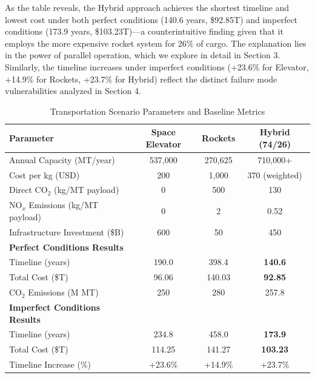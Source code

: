 \documentclass[12pt]{article}
\begin{document}
	As the table reveals, the Hybrid approach achieves the shortest timeline and lowest cost under both perfect conditions (140.6 years, \$92.85T) and imperfect conditions (173.9 years, \$103.23T)---a counterintuitive finding given that it employs the more expensive rocket system for 26\% of cargo. The explanation lies in the power of parallel operation, which we explore in detail in Section 3. Similarly, the timeline increases under imperfect conditions (+23.6\% for Elevator, +14.9\% for Rockets, +23.7\% for Hybrid) reflect the distinct failure mode vulnerabilities analyzed in Section 4.
	\begin{table}[H]
		\centering
		\caption{Transportation Scenario Parameters and Baseline Metrics}
		\label{tab:parameters}
		\begin{tabular}{lccc}
			\toprule
			\textbf{Parameter} & \textbf{Space Elevator} & \textbf{Rockets} & \textbf{Hybrid (74/26)} \\
			\midrule
			Annual Capacity (MT/year) & 537,000 & 270,625 & 710,000+ \\
			Cost per kg (USD) & 200 & 1,000 & 370 (weighted) \\
			Direct CO$_2$ (kg/MT payload) & 0 & 500 & 130 \\
			NO$_x$ Emissions (kg/MT payload) & 0 & 2 & 0.52 \\
			Infrastructure Investment (\$B) & 600 & 50 & 450 \\
			\midrule
			\textbf{Perfect Conditions Results} & & & \\
			Timeline (years) & 190.0 & 398.4 & \textbf{140.6} \\
			Total Cost (\$T) & 96.06 & 140.03 & \textbf{92.85} \\
			CO$_2$ Emissions (M MT) & 250 & 280 & 257.8 \\
			\midrule
			\textbf{Imperfect Conditions Results} & & & \\
			Timeline (years) & 234.8 & 458.0 & \textbf{173.9} \\
			Total Cost (\$T) & 114.25 & 141.27 & \textbf{103.23} \\
			Timeline Increase (\%) & +23.6\% & +14.9\% & +23.7\% \\
			\bottomrule
		\end{tabular}
	\end{table}
	
\end{document}
